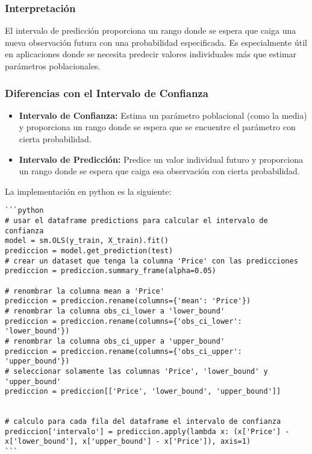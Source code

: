 \subsubsection{Interpretación}\label{interpretaciuxf3n}

El intervalo de predicción proporciona un rango donde se espera que
caiga una nueva observación futura con una probabilidad especificada. Es
especialmente útil en aplicaciones donde se necesita predecir valores
individuales más que estimar parámetros poblacionales.

\subsubsection{Diferencias con el Intervalo de
Confianza}\label{diferencias-con-el-intervalo-de-confianza}

\begin{itemize}
\item
  \textbf{Intervalo de Confianza:} Estima un parámetro poblacional (como
  la media) y proporciona un rango donde se espera que se encuentre el
  parámetro con cierta probabilidad.
\item
  \textbf{Intervalo de Predicción:} Predice un valor individual futuro y
  proporciona un rango donde se espera que caiga esa observación con
  cierta probabilidad.
\end{itemize}

La implementación en python es la siguiente:

\begin{verbatim}
```python
# usar el dataframe predictions para calcular el intervalo de confianza
model = sm.OLS(y_train, X_train).fit()
prediccion = model.get_prediction(test)
# crear un dataset que tenga la columna 'Price' con las predicciones
prediccion = prediccion.summary_frame(alpha=0.05)

# renombrar la columna mean a 'Price'
prediccion = prediccion.rename(columns={'mean': 'Price'})
# renombrar la columna obs_ci_lower a 'lower_bound'
prediccion = prediccion.rename(columns={'obs_ci_lower': 'lower_bound'})
# renombrar la columna obs_ci_upper a 'upper_bound'
prediccion = prediccion.rename(columns={'obs_ci_upper': 'upper_bound'})
# seleccionar solamente las columnas 'Price', 'lower_bound' y 'upper_bound'
prediccion = prediccion[['Price', 'lower_bound', 'upper_bound']]


# calculo para cada fila del dataframe el intervalo de confianza
prediccion['intervalo'] = prediccion.apply(lambda x: (x['Price'] - x['lower_bound'], x['upper_bound'] - x['Price']), axis=1)
```
\end{verbatim}
